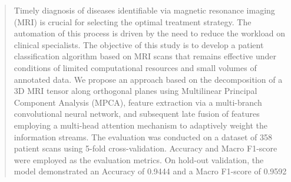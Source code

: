 \documentclass[eqsecnum, authorsinfo]{kioj6}
\begin{document}
\begin{translatedpart}
    \maketranslatedtitle

    \begin{abstract}
        Timely diagnosis of diseases identifiable via magnetic resonance imaging (MRI) is crucial for selecting the optimal treatment strategy. 
        The automation of this process is driven by the need to reduce the workload on clinical specialists. 
        The objective of this study is to develop a patient classification algorithm based on MRI scans that remains effective under conditions 
        of limited computational resources and small volumes of annotated data. We propose an approach based on the decomposition of a 3D MRI tensor along 
        orthogonal planes using Multilinear Principal Component Analysis (MPCA), feature extraction via a multi-branch convolutional neural network, 
        and subsequent late fusion of features employing a multi-head attention mechanism to adaptively weight the information streams. 
        The evaluation was conducted on a dataset of 358 patient scans using 5-fold cross-validation. 
        Accuracy and Macro F1-score were employed as the evaluation metrics. On hold-out validation, the model demonstrated an Accuracy of 0.9444 and a 
        Macro F1-score of 0.9592

        \autocitation
    \end{abstract}

\end{translatedpart}
\end{document}
